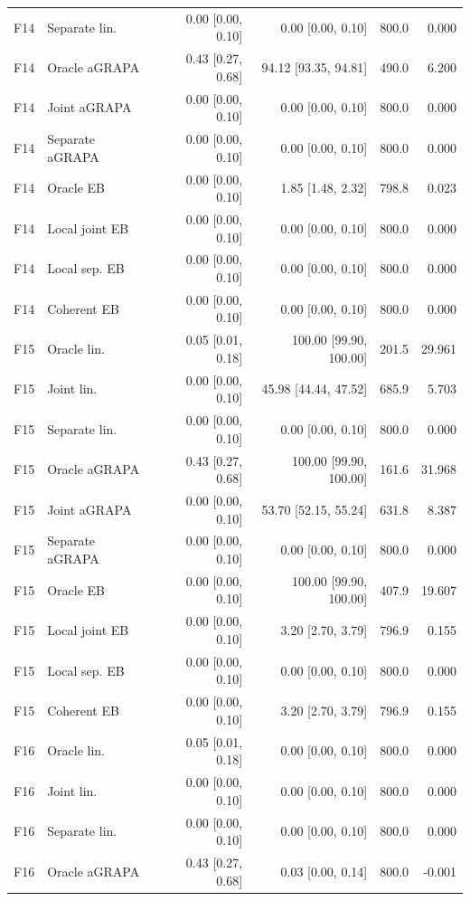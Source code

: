 \begin{longtable}{llrrrr}
F14 & Separate lin. & 0.00 [0.00, 0.10] & 0.00 [0.00, 0.10] & 800.0 & 0.000\\
F14 & Oracle aGRAPA & 0.43 [0.27, 0.68] & 94.12 [93.35, 94.81] & 490.0 & 6.200\\
F14 & Joint aGRAPA & 0.00 [0.00, 0.10] & 0.00 [0.00, 0.10] & 800.0 & 0.000\\
F14 & Separate aGRAPA & 0.00 [0.00, 0.10] & 0.00 [0.00, 0.10] & 800.0 & 0.000\\
F14 & Oracle EB & 0.00 [0.00, 0.10] & 1.85 [1.48, 2.32] & 798.8 & 0.023\\
F14 & Local joint EB & 0.00 [0.00, 0.10] & 0.00 [0.00, 0.10] & 800.0 & 0.000\\
F14 & Local sep. EB & 0.00 [0.00, 0.10] & 0.00 [0.00, 0.10] & 800.0 & 0.000\\
F14 & Coherent EB & 0.00 [0.00, 0.10] & 0.00 [0.00, 0.10] & 800.0 & 0.000\\
F15 & Oracle lin. & 0.05 [0.01, 0.18] & 100.00 [99.90, 100.00] & 201.5 & 29.961\\
F15 & Joint lin. & 0.00 [0.00, 0.10] & 45.98 [44.44, 47.52] & 685.9 & 5.703\\
F15 & Separate lin. & 0.00 [0.00, 0.10] & 0.00 [0.00, 0.10] & 800.0 & 0.000\\
F15 & Oracle aGRAPA & 0.43 [0.27, 0.68] & 100.00 [99.90, 100.00] & 161.6 & 31.968\\
F15 & Joint aGRAPA & 0.00 [0.00, 0.10] & 53.70 [52.15, 55.24] & 631.8 & 8.387\\
F15 & Separate aGRAPA & 0.00 [0.00, 0.10] & 0.00 [0.00, 0.10] & 800.0 & 0.000\\
F15 & Oracle EB & 0.00 [0.00, 0.10] & 100.00 [99.90, 100.00] & 407.9 & 19.607\\
F15 & Local joint EB & 0.00 [0.00, 0.10] & 3.20 [2.70, 3.79] & 796.9 & 0.155\\
F15 & Local sep. EB & 0.00 [0.00, 0.10] & 0.00 [0.00, 0.10] & 800.0 & 0.000\\
F15 & Coherent EB & 0.00 [0.00, 0.10] & 3.20 [2.70, 3.79] & 796.9 & 0.155\\
F16 & Oracle lin. & 0.05 [0.01, 0.18] & 0.00 [0.00, 0.10] & 800.0 & 0.000\\
F16 & Joint lin. & 0.00 [0.00, 0.10] & 0.00 [0.00, 0.10] & 800.0 & 0.000\\
F16 & Separate lin. & 0.00 [0.00, 0.10] & 0.00 [0.00, 0.10] & 800.0 & 0.000\\
F16 & Oracle aGRAPA & 0.43 [0.27, 0.68] & 0.03 [0.00, 0.14] & 800.0 & -0.001\\

\end{longtable}
